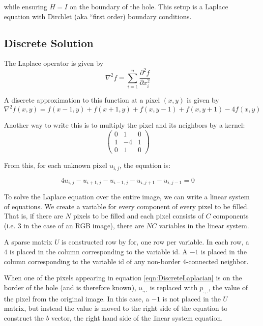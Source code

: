 \documentclass{InsightArticle}
\begin{document}
while ensuring $H=I$ on the boundary of the hole. This setup is a Laplace equation with Dirchlet (aka ``first order) boundary conditions. 

\subsection{Discrete Solution}
The Laplace operator is given by
\begin{equation}
 \nabla^2 f = \sum_{i=1}^n \frac{\partial^2 f}{\partial x_i^2}
\end{equation}

A discrete approximation to this function at a pixel $(x,y)$ is given by
\begin{equation}
 \nabla^2 f(x,y) = f(x-1,y) + f(x+1,y) + f(x,y-1) + f(x,y+1) - 4f(x,y)
\end{equation}

Another way to write this is to multiply the pixel and its neighbors by a kernel:
\begin{equation}
\begin{pmatrix}
0 & 1 & 0 \\
1 & -4 & 1\\
0 & 1 & 0
\end{pmatrix}
\end{equation}


From this, for each unknown pixel $u_{i,j}$, the equation is:

\begin{equation}
\label{eqn:DiscreteLaplacian}
4 u_{i,j} - u_{i+1,j} - u_{i-1,j} - u_{i,j+1} - u_{i,j-1} = 0
\end{equation}

To solve the Laplace equation over the entire image, we can write a linear system of equations. We create a variable for every component of every pixel to be filled. That is, if there are $N$ pixels to be filled and each pixel consists of $C$ components (i.e. 3 in the case of an RGB image), there are $NC$ variables in the linear system. 

A sparse matrix $U$ is constructed row by for, one row per variable. In each row, a $4$ is placed in the column corresponding to the variable id. A $-1$ is placed in the column corresponding to the variable id of any non-border 4-connected neighbor.

When one of the pixels appearing in equation \ref{eqn:DiscreteLaplacian} is on the border of the hole (and is therefore known), $u_{.,.}$ is replaced with $p_{.,.}$, the value of the pixel from the original image. In this case, a $-1$ is not placed in the $U$ matrix, but instead the value is moved to the right side of the equation to construct the $b$ vector, the right hand side of the linear system equation.
\end{document}
